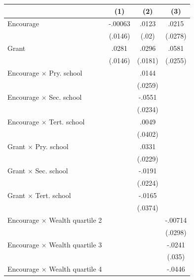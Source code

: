 \begin{tabular*}{\hsize}{@{\hskip\tabcolsep\extracolsep\fill}l*{3}{c}}
\toprule
                    &\multicolumn{1}{c}{(1)}&\multicolumn{1}{c}{(2)}&\multicolumn{1}{c}{(3)}\\
\midrule
Encourage           &     -.00063&       .0123&       .0215\\
                    &     (.0146)&       (.02)&     (.0278)\\
\addlinespace
Grant               &       .0281&       .0296&       .0581\\
                    &     (.0146)&     (.0181)&     (.0255)\\
\addlinespace
Encourage $\times$ Pry. school&            &       .0144&            \\
                    &            &     (.0259)&            \\
\addlinespace
Encourage $\times$ Sec. school&            &      -.0551&            \\
                    &            &     (.0234)&            \\
\addlinespace
Encourage $\times$ Tert. school&            &       .0049&            \\
                    &            &     (.0402)&            \\
\addlinespace
Grant $\times$ Pry. school&            &       .0331&            \\
                    &            &     (.0229)&            \\
\addlinespace
Grant $\times$ Sec. school&            &      -.0191&            \\
                    &            &     (.0224)&            \\
\addlinespace
Grant $\times$ Tert. school&            &      -.0165&            \\
                    &            &     (.0374)&            \\
\addlinespace
Encourage $\times$ Wealth quartile 2&            &            &     -.00714\\
                    &            &            &     (.0298)\\
\addlinespace
Encourage $\times$ Wealth quartile 3&            &            &      -.0241\\
                    &            &            &      (.035)\\
\addlinespace
Encourage $\times$ Wealth quartile 4&            &            &      -.0446\\

\end{tabular*}
